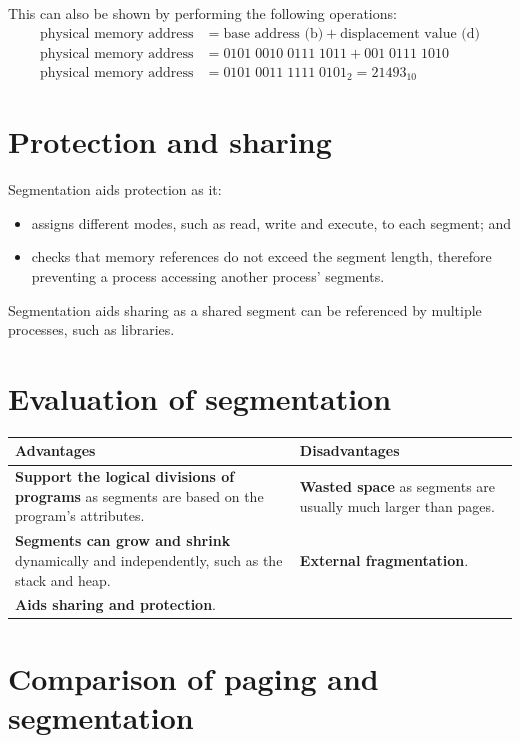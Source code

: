 \documentclass[a4paper]{systems-software}
\begin{document}
This can also be shown by performing the following operations:
\begin{equation*}
	\begin{aligned}
		\text{physical memory address} & = \text{base address (b)} + \text{displacement value (d)} \\
		\text{physical memory address} & = 0101\;0010\;0111\;1011 + 001\;0111\;1010 \\
		\text{physical memory address} & = 0101\;0011\;1111\;0101_{2} = 21493_{10}
	\end{aligned}
\end{equation*}


\section*{Protection and sharing}

Segmentation aids protection as it:
\begin{itemize}
	\item assigns different modes, such as read, write and execute, to each segment; and
	\item checks that memory references do not exceed the segment length, therefore preventing a process accessing another process' segments.
\end{itemize}

Segmentation aids sharing as a shared segment can be referenced by multiple processes, such as libraries.


\section*{Evaluation of segmentation}

\begin{longtabu} to \textwidth {| X[1,l] | X[1,l] |}
    \hline
    \textbf{Advantages} & \textbf{Disadvantages}
	\\ \hline
	\textbf{Support the logical divisions of programs} as segments are based on the program's attributes. &
	\textbf{Wasted space} as segments are usually much larger than pages.
	\\ \hline
	\textbf{Segments can grow and shrink} dynamically and independently, such as the stack and heap. &
	\textbf{External fragmentation}.
	\\ \hline
	\textbf{Aids sharing and protection}. &
	\\ \hline
\end{longtabu}


\section{Comparison of paging and segmentation}
\end{document}
